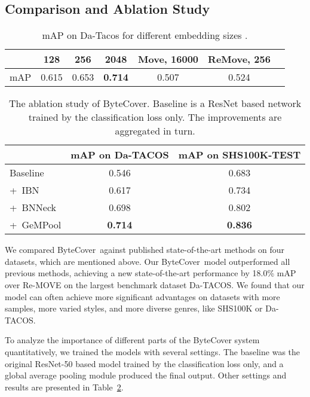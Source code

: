 \documentclass{article}
\newcommand{\tabref}[1]{\mbox{Table~\ref{#1}}}
\newcommand{\ourname}{ByteCover}
\begin{document}
 \vspace{-1em}
\subsection{Comparison and Ablation Study}
\label{ssec:comp}

\begin{table}[]
\small
\centering
\begin{tabular}{@{}ccccccc@{}}
\toprule    & 128 & 256 & 2048 & Move, 16000 & ReMove, 256  \\ \midrule
mAP &   0.615    & 0.653 & \textbf{0.714}  & 0.507         & 0.524                   \\ \bottomrule
\end{tabular}
\vspace{-0.6em}
\caption{mAP on Da-Tacos for different embedding sizes .}
\label{tab:size}
\end{table} \begin{table}[]
\small
\centering
\begin{tabular}{@{}lcc@{}}
\toprule
         & mAP on Da-TACOS & mAP on SHS100K-TEST \\ \midrule
Baseline & 0.546          & 0.683               \\
+~IBN     & 0.617             & 0.734               \\
+~BNNeck  & 0.698           & 0.802               \\
+~GeMPool & \textbf{0.714}           & \textbf{0.836}               \\ \bottomrule
\end{tabular}
\vspace{-0.8em}
\caption{The ablation study of ByteCover. Baseline is a ResNet based network trained by the classification loss only. The improvements are aggregated in turn.}
\vspace{-0.3em}
\label{tab:ablation}
\end{table} 
We compared \ourname\ against published state-of-the-art methods on four datasets, which are mentioned above. 
Our \ourname\ model outperformed all previous methods, achieving a new state-of-the-art performance by 18.0\% mAP over Re-MOVE \cite{yesiler2020less} on the largest benchmark dataset Da-TACOS. We found that our model can often achieve more significant advantages on datasets with more samples, more varied styles, and more diverse genres, like SHS100K or Da-TACOS.  \par
To analyze the importance of different parts of the ByteCover system quantitatively, we trained the models with several settings. The baseline was the original ResNet-50 based model trained by the classification loss only, and a global average pooling module produced the final output. Other settings and results are presented in \tabref{tab:ablation}. 
\end{document}
